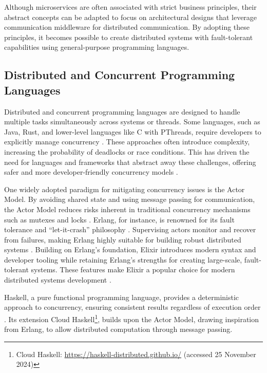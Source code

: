 Although microservices are often associated with strict business principles, their abstract concepts can be adapted to focus on architectural designs that leverage communication middleware for distributed communication. By adopting these principles, it becomes possible to create distributed systems with fault-tolerant capabilities using general-purpose programming languages.


\subsection{Distributed and Concurrent Programming Languages}

Distributed and concurrent programming languages are designed to handle multiple tasks simultaneously across systems or threads. Some languages, such as Java, Rust, and lower-level languages like C with PThreads, require developers to explicitly manage concurrency \cite{Valkov2018,Paduraru2018}. These approaches often introduce complexity, increasing the probability of deadlocks or race conditions. This has driven the need for languages and frameworks that abstract away these challenges, offering safer and more developer-friendly concurrency models \cite{Valkov2018}.

One widely adopted paradigm for mitigating concurrency issues is the Actor Model. By avoiding shared state and using message passing for communication, the Actor Model reduces risks inherent in traditional concurrency mechanisms such as mutexes and locks \cite{Valkov2018}. Erlang, for instance, is renowned for its fault tolerance and “let-it-crash” philosophy \cite{Armstrong2013}. Supervising actors monitor and recover from failures, making Erlang highly suitable for building robust distributed systems \cite{Armstrong2013}. Building on Erlang’s foundation, Elixir introduces modern syntax and developer tooling while retaining Erlang’s strengths for creating large-scale, fault-tolerant systems. These features make Elixir a popular choice for modern distributed systems development \cite{Juric2024}.

Haskell, a pure functional programming language, provides a deterministic approach to concurrency, ensuring consistent results regardless of execution order \cite{Valkov2018}. Its extension Cloud Haskell\footnote{Cloud Haskell: \url{https://haskell-distributed.github.io/} (accessed 25 November 2024)}, builds upon the Actor Model, drawing inspiration from Erlang, to allow distributed computation through message passing.


